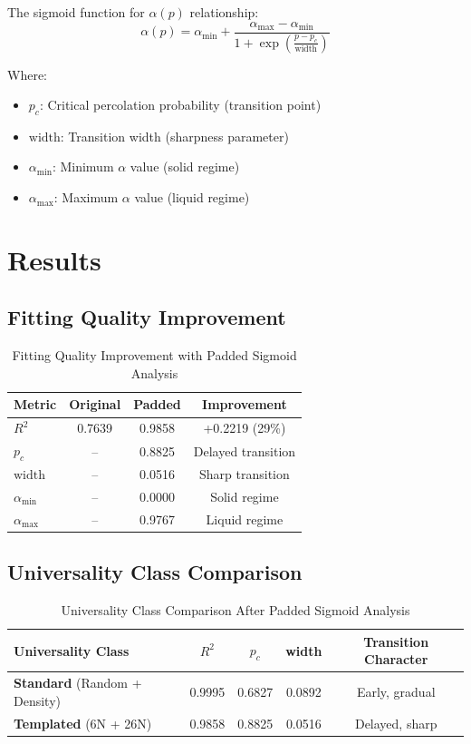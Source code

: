 \documentclass[11pt]{article}
\begin{document}
The sigmoid function for $\alpha(p)$ relationship:
\begin{equation}
    \alpha(p) = \alpha_{\min} + \frac{\alpha_{\max} - \alpha_{\min}}{1 + \exp\left(\frac{p - p_c}{\text{width}}\right)}
\end{equation}

Where:
\begin{itemize}
    \item $p_c$: Critical percolation probability (transition point)
    \item $\text{width}$: Transition width (sharpness parameter)
    \item $\alpha_{\min}$: Minimum $\alpha$ value (solid regime)
    \item $\alpha_{\max}$: Maximum $\alpha$ value (liquid regime)
\end{itemize}

\section{Results}

\subsection{Fitting Quality Improvement}

\begin{table}[h!]
\centering
\caption{Fitting Quality Improvement with Padded Sigmoid Analysis}
\begin{tabular}{@{}lccc@{}}
\toprule
\textbf{Metric} & \textbf{Original} & \textbf{Padded} & \textbf{Improvement} \\
\midrule
$R^2$ & 0.7639 & 0.9858 & +0.2219 (29\%) \\
$p_c$ & -- & 0.8825 & Delayed transition \\
$\text{width}$ & -- & 0.0516 & Sharp transition \\
$\alpha_{\min}$ & -- & 0.0000 & Solid regime \\
$\alpha_{\max}$ & -- & 0.9767 & Liquid regime \\
\bottomrule
\end{tabular}
\end{table}

\subsection{Universality Class Comparison}

\begin{table}[h!]
\centering
\caption{Universality Class Comparison After Padded Sigmoid Analysis}
\begin{tabular}{@{}lcccc@{}}
\toprule
\textbf{Universality Class} & \textbf{$R^2$} & \textbf{$p_c$} & \textbf{width} & \textbf{Transition Character} \\
\midrule
\textbf{Standard} (Random + Density) & 0.9995 & 0.6827 & 0.0892 & Early, gradual \\
\textbf{Templated} (6N + 26N) & 0.9858 & 0.8825 & 0.0516 & Delayed, sharp \\
\bottomrule
\end{tabular}
\end{table}
\end{document}
